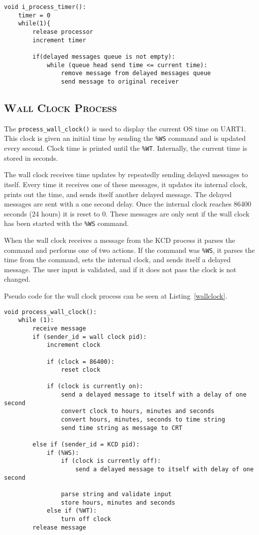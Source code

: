 \documentclass[oneside]{report}
\begin{document}
\begin{lstlisting}
void i_process_timer():
    timer = 0
    while(1){
        release processor
        increment timer

        if(delayed messages queue is not empty):
            while (queue head send time <= current time):
                remove message from delayed messages queue
                send message to original receiver
\end{lstlisting}

\subsection{\textsc{Wall Clock Process}}
The \texttt{process\_wall\_clock()} is used to display the current OS
time on UART1. This clock is given an initial time by sending the
\texttt{\%WS} command and is updated every second. Clock time is printed
until the \texttt{\%WT}. Internally, the current time is stored in seconds.

The wall clock receives time updates by repeatedly sending delayed
messages to itself. Every time it receives one of these messages, it
updates its internal clock, prints out the time, and sends itself
another delayed message. The delayed messages are sent with a one
second delay. Once the internal clock reaches 86400 seconds (24 hours)
it is reset to 0. These messages are only sent if the wall clock has
been started with the \texttt{\%WS} command.

When the wall clock receives a message from the KCD process it parses
the command and performs one of two actions. If the command was
\texttt{\%WS}, it parses the time from the command, sets the internal
clock, and sends itself a delayed message. The user input is
validated, and if it does not pass the clock is not changed.

Pseudo code for the wall clock process can be seen at
Listing~\ref{wallclock}.

\begin{lstlisting}
void process_wall_clock():
    while (1):
        receive message
        if (sender_id = wall clock pid):
            increment clock

            if (clock = 86400):
                reset clock

            if (clock is currently on):
                send a delayed message to itself with a delay of one second
                convert clock to hours, minutes and seconds
                convert hours, minutes, seconds to time string
                send time string as message to CRT

        else if (sender_id = KCD pid):
            if (%WS):
                if (clock is currently off):
                    send a delayed message to itself with delay of one second

                parse string and validate input
                store hours, minutes and seconds
            else if (%WT):
                turn off clock
        release message
\end{lstlisting}
\end{document}

